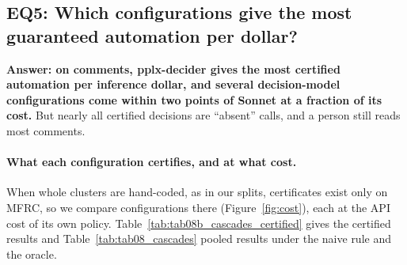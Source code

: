 \FloatBarrier
\subsection{EQ5: Which configurations give the most guaranteed automation per dollar?}
\label{sec:eq5}

\textbf{Answer: on comments, pplx-decider gives the most certified automation per inference dollar, and several
decision-model configurations come within two points of Sonnet at a fraction of its cost.} But nearly all certified decisions
are ``absent'' calls, and a person still reads most comments.

\paragraph{What each configuration certifies, and at what cost.} When whole clusters are hand-coded, as in our splits,
certificates exist only on MFRC, so we compare configurations there (Figure~\ref{fig:cost}), each at the API cost of its own
policy. Table~\ref{tab:tab08b_cascades_certified} gives the certified results and Table~\ref{tab:tab08_cascades} pooled
results under the naive rule and the oracle.
